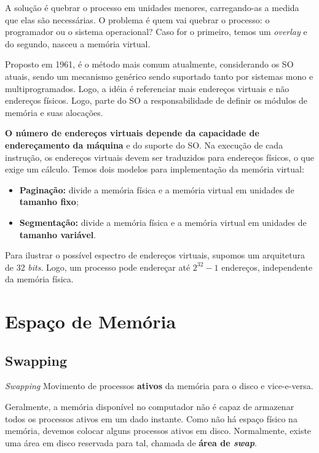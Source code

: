 A solução é quebrar o processo em unidades menores, carregando-as a medida que elas são necessárias. O problema é quem vai quebrar o processo: o programador ou o sistema operacional? Caso for o primeiro, temos um \textit{overlay} e do segundo, nasceu a memória virtual.

Proposto em 1961, é o método mais comum atualmente, considerando os SO atuais, sendo um mecanismo genérico sendo suportado tanto por sistemas mono e multiprogramados. Logo, a idéia é referenciar mais endereços virtuais e não endereços físicos. Logo, parte do SO a responsabilidade de definir os módulos de memória e suas alocações.

\textbf{O número de endereços virtuais depende da capacidade de endereçamento da máquina} e do suporte do SO. Na execução de cada instrução, os endereços virtuais devem ser traduzidos para endereços físicos, o que exige um cálculo. Temos dois modelos para implementação da memória virtual:

\begin{itemize}
  \item \textbf{Paginação:} divide a memória física e a memória virtual em unidades de \textbf{tamanho fixo};

  \item \textbf{Segmentação:} divide a memória física e a memória virtual em unidades de \textbf{tamanho variável}.
\end{itemize}

Para ilustrar o possível espectro de endereços virtuais, supomos um arquitetura de 32 \textit{bits}. Logo, um processo pode endereçar até $2^{32} - 1$ endereços, independente da memória física.





\section{Espaço de Memória}

\subsection{Swapping}
\begin{definicao}{\textit{Swapping}}
  Movimento de processos \textbf{ativos} da memória para o disco e vice-e-versa.
\end{definicao}

Geralmente, a memória disponível no computador não é capaz de armazenar todos os processos ativos em um dado instante. Como não há espaço físico na memória, devemos colocar alguns processos ativos em disco. Normalmente, existe uma área em disco reservada para tal, chamada de \textbf{área de \textit{swap}}.

